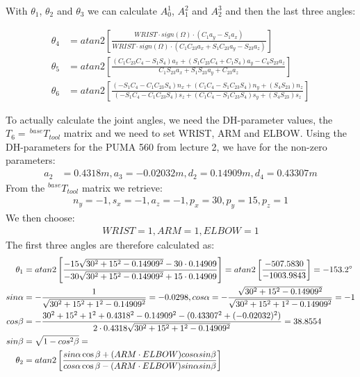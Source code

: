 With $\theta_1$, $\theta_2$ and $\theta_3$ we can calculate $A_0^1$, $A_1^2$ and $A_2^3$ and then the last three angles:

\begin{align*}
\theta_4 &=atan2\left[\frac{WRIST\cdot sign(\Omega)\cdot(C_1a_y-S_1a_x)}{WRIST\cdot sign(\Omega)\cdot(C_1C_{23}a_x+S_1C_{23}a_y-S_{23}a_z)}\right]\\
\theta_5 &=atan2\left[\frac{(C_1C_{23}C_4-S_1S_4)a_x+(S_1C_{23}C_4+C_1S_4)a_y-C_4S_{23}a_z}{C_1S_{23}a_x+S_1S_{23}a_y+C_{23}a_z}\right]\\
\theta_6 &=atan2\left[\frac{(-S_1C_4-C_1C_{23}S_4)n_x+(C_1C_4-S_1C_{23}S_4)n_y+(S_4S_{23})n_z}{(-S_1C_4-C_1C_{23}S_4)s_z+(C_1C_4-S_1C_{23}S_4)s_y+(S_4S_{23})s_z}\right]
\end{align*}

To actually calculate the joint angles, we need the DH-parameter values, the $T_6=\,^{base}T_{tool}$ matrix and we need to set WRIST, ARM and ELBOW.
Using the DH-parameters for the PUMA 560 from lecture 2, we have for the non-zero parameters:
\begin{align*}
a_2 &= 0.4318m, a_3=-0.02032m, d_2=0.14909m, d_4=0.43307m
\end{align*}
From the $^{base}T_{tool}$ matrix we retrieve:
\begin{align*}
n_y = -1, s_x = -1, a_z = -1, p_x = 30, p_y = 15, p_z = 1
\end{align*}
We then choose:
\begin{align*}
WRIST = 1, ARM = 1, ELBOW = 1
\end{align*}
The first three angles are therefore calculated as:
\begin{align*}
\theta_1 &=atan2\left[\frac{-15\sqrt{30^2+15^2-0.14909^2}-30\cdot 0.14909}{-30\sqrt{30^2+15^2-0.14909^2}+15\cdot 0.14909}\right] = atan2\left[\frac{-507.5830}{-1003.9843}\right] = -153.2\degree\\
sin\alpha &= -\frac{1}{\sqrt{30^2+15^2+1^2-0.14909^2}} =-0.0298, cos\alpha = -\frac{\sqrt{30^2+15^2-0.14909^2}}{\sqrt{30^2+15^2+1^2-0.14909^2}} = -1\\
cos\beta &= -\frac{30^2+15^2+1^2+0.4318^2-0.14909^2-(0.43307^2+(-0.02032)^2)}{2\cdot 0.4318\sqrt{30^2+15^2+1^2-0.14909^2}} = 38.8554\\
sin\beta &= \sqrt{1-cos^2\beta} = \\
\theta_2 &=atan2\left[\frac{sin\alpha\cos\beta+(ARM\cdot ELBOW)cos\alpha sin\beta}{cos\alpha\cos\beta-(ARM\cdot ELBOW)sin\alpha sin\beta}\right]\\
\end{align*}